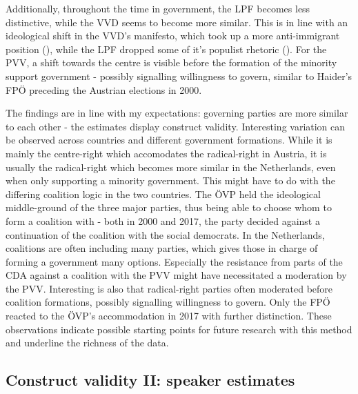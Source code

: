 \documentclass{article}
\begin{document}
Additionally, throughout the time in government, the LPF becomes less distinctive, while the VVD seems to become more similar. This is in line with an ideological shift in the VVD's manifesto, which took up a more anti-immigrant position (\cite{Pennings2003}), while the LPF dropped some of it's populist rhetoric (\cite{Lucardie2007LPF}). For the PVV, a shift towards the centre is visible before the formation of the minority support government - possibly signalling willingness to govern, similar to Haider's FPÖ preceding the Austrian elections in 2000.\par

The findings are in line with my expectations: governing parties are more similar to each other - the estimates display construct validity. Interesting variation can be observed across countries and different government formations. While it is mainly the centre-right which accomodates the radical-right in Austria, it is usually the radical-right which becomes more similar in the Netherlands, even when only supporting a minority government. This might have to do with the differing coalition logic in the two countries. The ÖVP held the ideological middle-ground of the three major parties, thus being able to choose whom to form a coalition with - both in 2000 and 2017, the party decided against a continuation of the coalition with the social democrats. In the Netherlands, coalitions are often including many parties, which gives those in charge of forming a government many options. Especially the resistance from parts of the CDA against a coalition with the PVV might have necessitated a moderation by the PVV. Interesting is also that radical-right parties often moderated before coalition formations, possibly signalling willingness to govern. Only the FPÖ reacted to the ÖVP's accommodation in 2017 with further distinction. These observations indicate possible starting points for future research with this method and underline the richness of the data.\par



\subsection{Construct validity II: speaker estimates}
\end{document}
